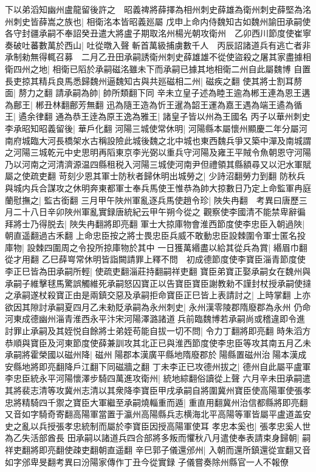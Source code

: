 下以弟滔知幽州盧龍留後許之　昭義禆將薛擇為相州刺史薛雄為衛州刺史薛堅為洺州刺史皆薛嵩之族也|{
	相衛洺本皆昭義廵屬}
戊申上命内侍魏知古如魏州諭田承嗣使各守封疆承嗣不奉詔癸丑遣大將盧子期取洺州楊光朝攻衛州　乙卯西川節度使崔寧奏破吐蕃數萬於西山|{
	吐從暾入聲}
斬首萬級捕虜數千人　丙辰詔諸道兵有逃亡者非承制勑無得輒召募　二月乙丑田承嗣誘衛州刺史薛雄雄不從使盜殺之屠其家盡據相衛四州之地|{
	相衛已䧟於承嗣磁洺雖未下而承嗣已據其地相衛二州自此屬魏博}
自置長吏掠其精兵良馬悉歸魏州逼魏知古與共廵磁相二州|{
	磁疾之翻}
使其將士割耳剺面|{
	剺力之翻}
請承嗣為帥|{
	帥所類翻下同}
辛未立皇子述為睦王逾為郴王連為恩王遘為鄜王|{
	郴丑林翻鄜芳無翻}
迅為隨王造為忻王暹為韶王運為嘉王遇為端王遹為循王|{
	遹余律翻}
通為恭王逹為原王逸為雅王|{
	諸皇子皆以州為王國名}
丙子以華州刺史李承昭知昭義留後|{
	華戶化翻}
河陽三城使常休明|{
	河陽縣本屬懷州顯慶二年分屬河南府城臨大河長橋架水古稱設險此城後魏之北中城也東西魏兵爭又築中潬及南城謂之河陽三城乾元中史思明再䧟東京李光弼以重兵守河陽及雍王平賊令魚朝恩守河陽乃以河南之河清濟源温四縣租税入河陽三城使河南尹但禮領其縣額尋又以汜水軍賦屬之使疏吏翻}
苛刻少恩其軍士防秋者歸休明出城勞之|{
	少詩沼翻勞力到翻}
防秋兵與城内兵合謀攻之休明奔東都軍士奉兵馬使王惟恭為帥大掠數日乃定上命監軍冉庭蘭慰撫之|{
	監古銜翻}
三月甲午陜州軍亂逐兵馬使趙令珍|{
	陜失冉翻　考異曰唐歷三月二十八日辛卯陜州軍亂實録唐統紀云甲午朔今從之}
觀察使李國清不能禁卑辭徧拜將士乃得脱去|{
	陜失冉翻將即亮翻}
軍士大掠庫物會淮西節度使李忠臣入朝過陜|{
	朝直遥翻過古禾翻}
上命忠臣按之將士畏忠臣兵威不敢動忠臣設棘圍令軍士匿名投庫物|{
	設棘四圍周之令投所掠庫物於其中}
一日獲萬緡盡以給其從兵為賞|{
	緡眉巾翻從才用翻}
乙巳薛㟧常休明皆詣闕請罪上釋不問　初成德節度使李寶臣淄青節度使李正巳皆為田承嗣所輕|{
	使疏吏翻淄莊持翻嗣祥吏翻}
寶臣弟寶正娶承嗣女在魏州與承嗣子維擊毬馬驚誤觸維死承嗣怒囚寶正以告寶臣寶臣謝教勑不謹封杖授承嗣使撻之承嗣遂杖殺寶正由是兩鎮交惡及承嗣拒命寶臣正巳皆上表請討之|{
	上時掌翻}
上亦欲因其隙討承嗣夏四月乙未勑貶承嗣為永州刺史|{
	永州漢零陵郡隋廢郡為永州}
仍命河東成德幽州淄青淮西永平汴宋河陽澤潞諸道兵前臨魏博若承嗣尚或稽違即令進討罪止承嗣及其姪悦自餘將士弟姪苟能自拔一切不問|{
	令力丁翻將即亮翻}
時朱滔方恭順與寶臣及河東節度使薛兼訓攻其北正已與淮西節度使李忠臣等攻其南五月乙未承嗣將霍榮國以磁州降|{
	磁州陽郡本漢廣平縣地隋廢郡於陽縣置磁州治陽本漢成安縣地將即亮翻降戶江翻下同磁牆之翻}
丁未李正已攻德州拔之|{
	德州自此屬平盧軍}
李忠臣統永平河陽懷澤步騎四萬進攻衛州|{
	統地綜翻俗讀從上聲}
六月辛未田承嗣遣其將裴志清等攻冀州志清以其衆降李寶臣甲戌承嗣自將圍冀州寶臣使高陽軍使張孝忠將精騎四千禦之寶臣大軍繼至承嗣燒輜重而遁|{
	重直用翻冀州治信都縣將即亮翻又音如字騎奇寄翻高陽軍當置于瀛州高陽縣兵志横海北平高陽等軍皆屬平盧道盖安史之亂以兵授張孝忠統制而屬於李寶臣因授高陽軍使耳}
孝忠本奚也|{
	張孝忠奚人世為乙失活部酋長}
田承嗣以諸道兵四合部將多叛而懼秋八月遣使奉表請束身歸朝|{
	嗣祥吏翻將即亮翻使疎吏翻朝直遥翻}
辛巳郭子儀還邠州|{
	入朝而還所鎮還從宣翻又音如字邠卑旻翻考異曰汾陽家傳作丁丑今從實録}
子儀嘗奏除州縣官一人不報僚

